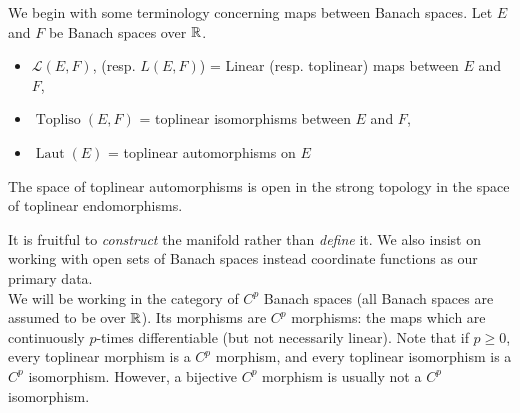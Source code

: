 \documentclass[../main-manifolds.tex]{subfiles}
\providecommand{\Laut}{\operatorname{Laut}}
\providecommand{\Topliso}{\operatorname{Topliso}}
\begin{document}

We begin with some terminology concerning maps between Banach spaces. Let $E$ and $F$ be Banach spaces over $\mathbb{R}$.
\begin{itemize}
    \item $\mathcal{L}(E,F)$, (resp. $L(E,F)$) = Linear (resp. toplinear) maps between $E$ and $F$, 
    \item $\Topliso(E,F)$ = toplinear isomorphisms between $E$ and $F$,
    \item $\Laut(E)$ = toplinear automorphisms on $E$
\end{itemize}
\begin{remark}
    The space of toplinear automorphisms is open in the strong topology in the space of toplinear endomorphisms.
\end{remark}

It is fruitful to \emph{construct} the manifold rather than \emph{define} it. We also insist on working with open sets of Banach spaces instead coordinate functions as our primary data.\\

We will be working in the category of $C^p$ Banach spaces (all Banach spaces are assumed to be over $\mathbb{R}$). Its morphisms are $C^p$ morphisms: the maps which are continuously $p$-times differentiable (but not necessarily linear). Note that if $p\geq 0$, every toplinear morphism is a $C^p$ morphism, and every toplinear isomorphism is a $C^p$ isomorphism. However, a bijective $C^p$ morphism is usually not a $C^p$ isomorphism. 
\end{document}
